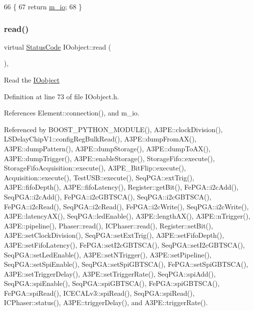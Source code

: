 \begin{DoxyCode}
66               \{
67     \textcolor{keywordflow}{return} \hyperlink{classIOobject_aa648e4128c3c37d8291d6bb26b57c504}{m\_io};
68   \}
\end{DoxyCode}
\mbox{\label{classIOobject_aa07610c11963b1db6710e3c76ceea456}} 
\subsubsection{\texorpdfstring{read()}{read()}}
{\footnotesize\ttfamily virtual \hyperlink{classStatusCode}{Status\+Code} I\+Oobject\+::read (\begin{DoxyParamCaption}{ }\end{DoxyParamCaption})\hspace{0.3cm}{\ttfamily [inline]}, {\ttfamily [virtual]}}

Read the \hyperlink{classIOobject}{I\+Oobject} 

Definition at line 73 of file I\+Oobject.\+h.



References Element\+::connection(), and m\+\_\+io.



Referenced by B\+O\+O\+S\+T\+\_\+\+P\+Y\+T\+H\+O\+N\+\_\+\+M\+O\+D\+U\+L\+E(), A3\+P\+E\+::clock\+Division(), L\+S\+Delay\+Chip\+V1\+::config\+Reg\+Bulk\+Read(), A3\+P\+E\+::dump\+From\+A\+X(), A3\+P\+E\+::dump\+Pattern(), A3\+P\+E\+::dump\+Storage(), A3\+P\+E\+::dump\+To\+A\+X(), A3\+P\+E\+::dump\+Trigger(), A3\+P\+E\+::enable\+Storage(), Storage\+Fifo\+::execute(), Storage\+Fifo\+Acquisition\+::execute(), A3\+P\+E\+\_\+\+Bit\+Flip\+::execute(), Acquisition\+::execute(), Test\+U\+S\+B\+::execute(), Seq\+P\+G\+A\+::ext\+Trig(), A3\+P\+E\+::fifo\+Depth(), A3\+P\+E\+::fifo\+Latency(), Register\+::get\+Bit(), Fe\+P\+G\+A\+::i2c\+Add(), Seq\+P\+G\+A\+::i2c\+Add(), Fe\+P\+G\+A\+::i2c\+G\+B\+T\+S\+C\+A(), Seq\+P\+G\+A\+::i2c\+G\+B\+T\+S\+C\+A(), Fe\+P\+G\+A\+::i2c\+Read(), Seq\+P\+G\+A\+::i2c\+Read(), Fe\+P\+G\+A\+::i2c\+Write(), Seq\+P\+G\+A\+::i2c\+Write(), A3\+P\+E\+::latency\+A\+X(), Seq\+P\+G\+A\+::led\+Enable(), A3\+P\+E\+::length\+A\+X(), A3\+P\+E\+::n\+Trigger(), A3\+P\+E\+::pipeline(), Phaser\+::read(), I\+C\+Phaser\+::read(), Register\+::set\+Bit(), A3\+P\+E\+::set\+Clock\+Division(), Seq\+P\+G\+A\+::set\+Ext\+Trig(), A3\+P\+E\+::set\+Fifo\+Depth(), A3\+P\+E\+::set\+Fifo\+Latency(), Fe\+P\+G\+A\+::set\+I2c\+G\+B\+T\+S\+C\+A(), Seq\+P\+G\+A\+::set\+I2c\+G\+B\+T\+S\+C\+A(), Seq\+P\+G\+A\+::set\+Led\+Enable(), A3\+P\+E\+::set\+N\+Trigger(), A3\+P\+E\+::set\+Pipeline(), Seq\+P\+G\+A\+::set\+Spi\+Enable(), Seq\+P\+G\+A\+::set\+Spi\+G\+B\+T\+S\+C\+A(), Fe\+P\+G\+A\+::set\+Spi\+G\+B\+T\+S\+C\+A(), A3\+P\+E\+::set\+Trigger\+Delay(), A3\+P\+E\+::set\+Trigger\+Rate(), Seq\+P\+G\+A\+::spi\+Add(), Seq\+P\+G\+A\+::spi\+Enable(), Seq\+P\+G\+A\+::spi\+G\+B\+T\+S\+C\+A(), Fe\+P\+G\+A\+::spi\+G\+B\+T\+S\+C\+A(), Fe\+P\+G\+A\+::spi\+Read(), I\+C\+E\+C\+A\+Lv3\+::spi\+Read(), Seq\+P\+G\+A\+::spi\+Read(), I\+C\+Phaser\+::status(), A3\+P\+E\+::trigger\+Delay(), and A3\+P\+E\+::trigger\+Rate().


